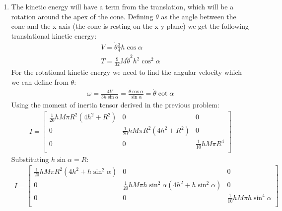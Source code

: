 \documentclass[10pt]{article}
\begin{document}
\begin{enumerate}
    \item The kinetic energy will have a term from the translation, which will be a rotation around the apex of the cone.
    Defining $\theta$ as the angle between the cone and the x-axis (the cone is resting on the x-y plane) we get the following translational kinetic energy:
    \begin{gather*}
      V=\dot{\theta}\frac{3}{4}h\cos\alpha\\
      T=\frac{9}{32}M\dot{\theta}^2 h^2\cos^2\alpha
    \end{gather*}
    For the rotational kinetic energy we need to find the angular velocity which we can define from $\dot{\theta}$:
    \begin{gather*}
      \omega=\frac{4V}{3h\sin\alpha}=\frac{\dot{\theta}\cos\alpha}{\sin\alpha}=\dot{\theta}\cot\alpha
    \end{gather*}
    Using the moment of inertia tensor derived in the previous problem:
    \begin{gather*}
      I=
      \begin{bmatrix}
        \frac{1}{20} h M \pi  R^2 \left(4 h^2+R^2\right) & 0                                              & 0                       \\
        0                                              & \frac{1}{20} h M \pi  R^2 \left(4 h^2+R^2\right) & 0                       \\
        0                                              & 0                                              & \frac{1}{10} h M \pi  R^4 \\
      \end{bmatrix}
    \end{gather*}
    Substituting $h\sin\alpha=R$:
    \begin{gather*}
      I=
      \begin{bmatrix}
        \frac{1}{20} h M \pi  R^2 \left(4 h^2+h\sin^2\alpha\right) & 0                                                                  & 0                                 \\
        0                                                        & \frac{1}{20} h M \pi  h\sin^2\alpha \left(4 h^2+h\sin^2\alpha\right) & 0                                 \\
        0                                                        & 0                                                                  & \frac{1}{10} h M \pi  h\sin^4\alpha \\
      \end{bmatrix}

\end{gather*}
\end{enumerate}
\end{document}
